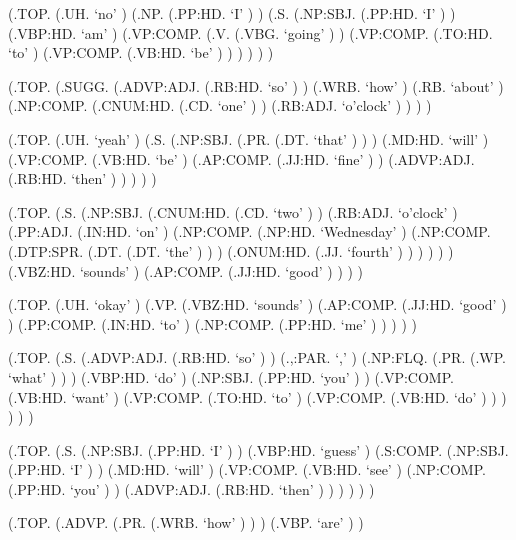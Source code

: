 \documentclass[10pt]{article}
\begin{document}
\begin{parsetree}  (.TOP. (.UH. `no' ) (.NP. (.PP:HD. `I' ) ) (.S. (.NP:SBJ. (.PP:HD. `I' ) ) (.VBP:HD. `am' ) (.VP:COMP. (.V. (.VBG. `going' ) ) (.VP:COMP. (.TO:HD. `to' ) (.VP:COMP. (.VB:HD. `be' ) ) ) ) ) ) \end{parsetree}

\begin{parsetree}  (.TOP. (.SUGG. (.ADVP:ADJ. (.RB:HD. `so' ) ) (.WRB. `how' ) (.RB. `about' ) (.NP:COMP. (.CNUM:HD. (.CD. `one' ) ) (.RB:ADJ. `o'clock' ) ) ) ) \end{parsetree}

\begin{parsetree}  (.TOP. (.UH. `yeah' ) (.S. (.NP:SBJ. (.PR. (.DT. `that' ) ) ) (.MD:HD. `will' ) (.VP:COMP. (.VB:HD. `be' ) (.AP:COMP. (.JJ:HD. `fine' ) ) (.ADVP:ADJ. (.RB:HD. `then' ) ) ) ) ) \end{parsetree}

\begin{parsetree}  (.TOP. (.S. (.NP:SBJ. (.CNUM:HD. (.CD. `two' ) ) (.RB:ADJ. `o'clock' ) (.PP:ADJ. (.IN:HD. `on' ) (.NP:COMP. (.NP:HD. `Wednesday' ) (.NP:COMP. (.DTP:SPR. (.DT. (.DT. `the' ) ) ) (.ONUM:HD. (.JJ. `fourth' ) ) ) ) ) ) (.VBZ:HD. `sounds' ) (.AP:COMP. (.JJ:HD. `good' ) ) ) ) \end{parsetree}

\begin{parsetree}  (.TOP. (.UH. `okay' ) (.VP. (.VBZ:HD. `sounds' ) (.AP:COMP. (.JJ:HD. `good' ) ) (.PP:COMP. (.IN:HD. `to' ) (.NP:COMP. (.PP:HD. `me' ) ) ) ) ) \end{parsetree}

\begin{parsetree}  (.TOP. (.S. (.ADVP:ADJ. (.RB:HD. `so' ) ) (.,:PAR. `,' ) (.NP:FLQ. (.PR. (.WP. `what' ) ) ) (.VBP:HD. `do' ) (.NP:SBJ. (.PP:HD. `you' ) ) (.VP:COMP. (.VB:HD. `want' ) (.VP:COMP. (.TO:HD. `to' ) (.VP:COMP. (.VB:HD. `do' ) ) ) ) ) ) \end{parsetree}

\begin{parsetree}  (.TOP. (.S. (.NP:SBJ. (.PP:HD. `I' ) ) (.VBP:HD. `guess' ) (.S:COMP. (.NP:SBJ. (.PP:HD. `I' ) ) (.MD:HD. `will' ) (.VP:COMP. (.VB:HD. `see' ) (.NP:COMP. (.PP:HD. `you' ) ) (.ADVP:ADJ. (.RB:HD. `then' ) ) ) ) ) ) \end{parsetree}

\begin{parsetree}  (.TOP. (.ADVP. (.PR. (.WRB. `how' ) ) ) (.VBP. `are' ) ) \end{parsetree}
\end{document}
